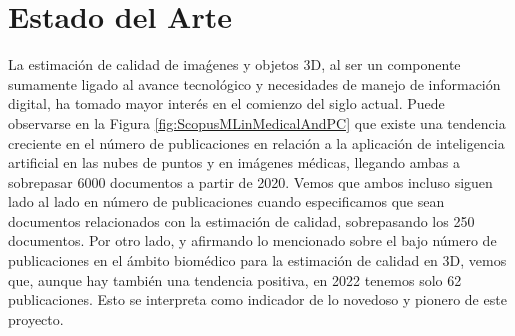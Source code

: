 \chapter{Estado del Arte}
\label{sec:EstadoDelArte}
La estimación de calidad de imaǵenes y objetos 3D, al ser un componente sumamente 
ligado al avance tecnológico y necesidades de manejo de información digital, ha 
tomado mayor interés en el comienzo del siglo actual.
Puede observarse en la Figura \ref{fig:ScopusMLinMedicalAndPC} que existe 
una tendencia creciente en el número de publicaciones en relación a la aplicación 
de inteligencia artificial en las nubes de puntos y en imágenes médicas, llegando
ambas a sobrepasar 6000 documentos a partir de 2020.  Vemos que ambos incluso siguen 
lado al lado en número de publicaciones cuando especificamos que sean documentos 
relacionados con la estimación de calidad, sobrepasando los 250 documentos. 
Por otro lado, y afirmando lo mencionado sobre el bajo número de publicaciones 
en el ámbito biomédico para la estimación de calidad en 3D, vemos que, aunque hay
también una tendencia positiva, en 2022 tenemos solo 62 publicaciones. Esto 
se interpreta como indicador de lo novedoso y pionero de este proyecto.
